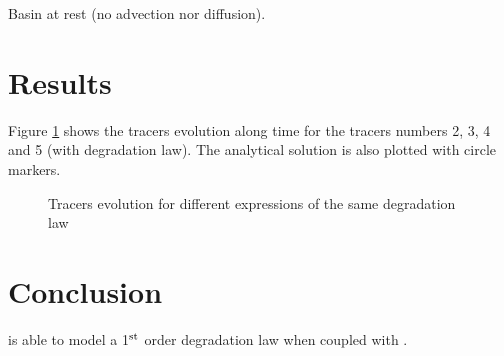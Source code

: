 Basin at rest (no advection nor diffusion).

\section{Results}

Figure \ref{fig:waq3d_degraddation:res} shows the tracers evolution along time for the tracers numbers 2, 3, 4 and 5
(with degradation law).
The analytical solution is also plotted with circle markers.

\begin{figure} [H]
\centering
{}
 \caption{Tracers evolution for different expressions of the same degradation law}
 \label{fig:waq3d_degraddation:res}
\end{figure}

\section{Conclusion}

\waqtel is able to model a 1$^{\rm{st}}$ order degradation law when coupled with
.
